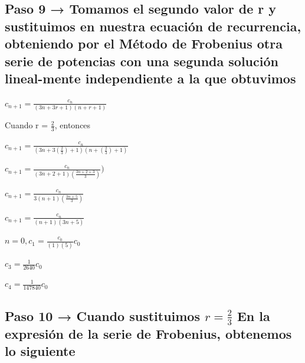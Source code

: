 \documentclass{article}
\begin{document}
 \subsection{Paso 9 → Tomamos el segundo valor de r y sustituimos en nuestra ecuación de recurrencia, obteniendo por el Método de Frobenius otra serie de potencias con una segunda solución lineal-mente independiente a la que obtuvimos}
 
\begin{center}
\LARGE $c_{n+1} = \frac{c_{n}}{(3n + 3r + 1) (n + r + 1)}$\newline
\end{center}

\begin{center}
\Large Cuando r = $\frac{2}{3}$, entonces\newline

\LARGE $c_{n+1} = \frac{c_{n}}{(3n + 3(\frac{2}{3}) + 1) (n + (\frac{2}{3}) + 1)}$\newline

\LARGE $c_{n+1} = \frac{c_{n}}{(3n + 2 + 1)  (\frac{3n + 2 + 3}{3})})$\newline

 \LARGE $c_{n+1} = \frac{c_{n}}{3( n + 1)  (\frac{3n + 5}{3})}$\newline
 
  \LARGE $c_{n+1} = \frac{c_{n}}{( n + 1) (3n + 5)}$\newline
  
 \LARGE $n = 0, c_{1} = \frac{c_{0}}{(1) (5)} c_{0}$\newline
  
\LARGE $ c_{3} = \frac{1}{2640} c_{0}$ \newline

\LARGE $ c_{4} = \frac{1}{147840} c_{0}$ \newline
\end{center}

\subsection{Paso 10 → Cuando sustituimos $ r = \frac{2}{3}$ En la expresión de la serie de Frobenius, obtenemos lo siguiente}
\end{document}
